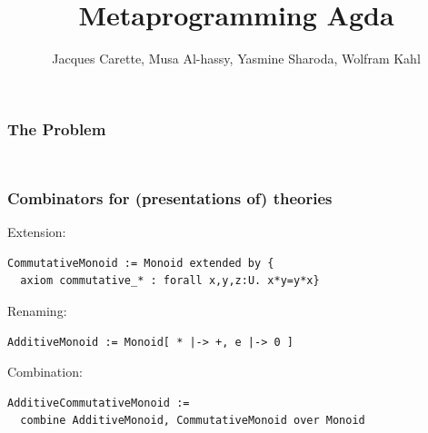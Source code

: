 \documentclass{beamer}
\title[Metaprogramming Agda]{Metaprogramming Agda}
\author[Carette, Al-hassy, Sharoda, Kahl]
  {\Large Jacques Carette, Musa Al-hassy, Yasmine Sharoda, Wolfram Kahl}
\institute[McMaster]{McMaster University}
\begin{document}
\begin{frame}
\thispagestyle{empty}
\titlepage
\end{frame}


\begin{frame}
\frametitle{The Problem}
\begin{columns}
  \hspace*{-2cm}
  \begin{column}{0.5\textwidth} 
    {\tiny {} }
    {\tiny {} }
  \end{column}
  \hspace*{-2cm}
  \begin{column}{0.5\textwidth}
    {\tiny {}}
    {\vspace*{\fill}}
  \end{column}
\end{columns}
\end{frame}

\begin{frame}[t,fragile]
\frametitle{Combinators for (presentations of) theories}
Extension:
\begin{lstlisting}
CommutativeMonoid := Monoid extended by {
  axiom commutative_* : forall x,y,z:U. x*y=y*x}
\end{lstlisting}
Renaming:
\begin{lstlisting}
AdditiveMonoid := Monoid[ * |-> +, e |-> 0 ]
\end{lstlisting}
Combination:
\begin{lstlisting}
AdditiveCommutativeMonoid := 
  combine AdditiveMonoid, CommutativeMonoid over Monoid
\end{lstlisting}
\end{frame}
\end{document}
